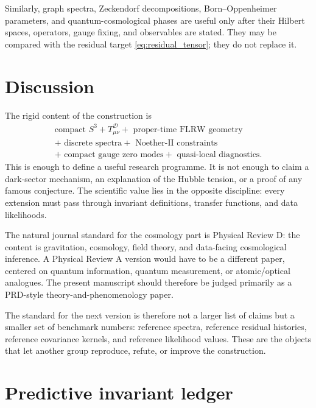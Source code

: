 \documentclass[
  aps,
  prd,
  reprint,
  superscriptaddress,
  nofootinbib,
  floatfix,
  longbibliography
]{revtex4-2}
\newcommand{\D}{\mathcal D}
\begin{document}
Similarly, graph spectra, Zeckendorf decompositions,
Born--Oppenheimer parameters, and quantum-cosmological phases are useful
only after their Hilbert spaces, operators, gauge fixing, and
observables are stated.  They may be compared with the residual target
\eqref{eq:residual_tensor}; they do not replace it.

\section{Discussion}
\label{sec:discussion}

The rigid content of the construction is
\begin{equation}
\begin{gathered}
  \text{compact }S^3
  +T^\D_{\mu\nu}
  +\text{ proper-time FLRW geometry}
  \\
  +\text{ discrete spectra}
  +\text{ Noether-II constraints}
  \\
  +\text{ compact gauge zero modes}
  +\text{ quasi-local diagnostics}.
\end{gathered}
\label{eq:core}
\end{equation}
This is enough to define a useful research programme.  It is not enough
to claim a dark-sector mechanism, an explanation of the Hubble tension,
or a proof of any famous conjecture.  The scientific value lies in the
opposite discipline: every extension must pass through invariant
definitions, transfer functions, and data likelihoods.

The natural journal standard for the cosmology part is Physical Review D:
the content is gravitation, cosmology, field theory, and data-facing
cosmological inference.  A Physical Review A version would have to be a
different paper, centered on quantum information, quantum measurement, or
atomic/optical analogues.  The present manuscript should therefore be
judged primarily as a PRD-style theory-and-phenomenology paper.


The standard for the next version is therefore not a larger list of
claims but a smaller set of benchmark numbers: reference spectra,
reference residual histories, reference covariance kernels, and
reference likelihood values.  These are the objects that let another
group reproduce, refute, or improve the construction.

\appendix

\section{Predictive invariant ledger}
\label{app:ledger}
\end{document}
